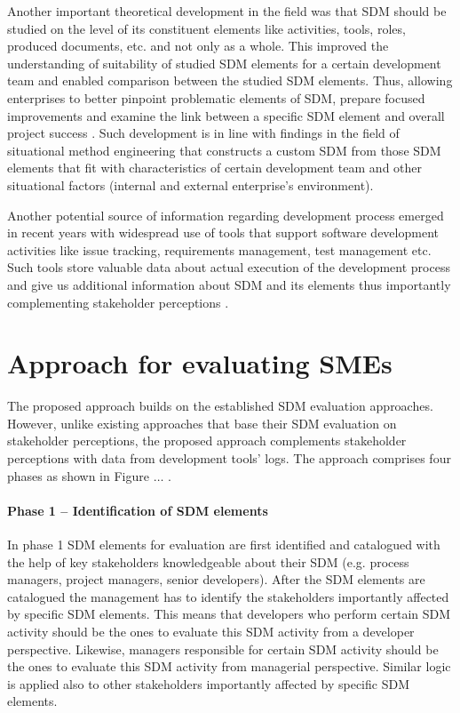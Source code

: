 Another important theoretical development in the field was that SDM should be studied on the level of its constituent elements like activities, tools, roles, produced documents, etc. and not only as a whole. This improved the understanding of suitability of studied SDM elements for a certain development team and enabled comparison between the studied SDM elements. Thus, allowing enterprises to better pinpoint problematic elements of SDM, prepare focused improvements and examine the link between a specific SDM element and overall project success \citep{atkinson1999project,hovelja2015exploring}. Such development is in line with findings in the field of situational method engineering \citep{DBLP:journals/ejis/KarlssonA09,DBLP:conf/caise/RalyteDR03} that constructs a custom SDM from those SDM elements that fit with characteristics of certain development team and other situational factors (internal and external enterprise’s environment). 

Another potential source of information regarding development process emerged in recent years with widespread use of tools that support software development activities like issue tracking, requirements management, test management etc. Such tools store valuable data about actual execution of the development process and give us additional information about SDM and its elements thus importantly complementing stakeholder perceptions \citep{DBLP:journals/ese/ChoetkiertikulD17,DBLP:conf/msr/MantylaADGO16,DBLP:conf/msr/OrtuMDTTMA16,DBLP:conf/icse/OrtuDKM15}. 

\section{Approach for evaluating SMEs}

The proposed approach builds on the established SDM evaluation approaches. However, unlike existing approaches that base their SDM evaluation on stakeholder perceptions, the proposed approach complements stakeholder perceptions with data from development tools’ logs. The approach comprises four phases as shown in Figure $\ldots$ .  




\paragraph{Phase 1 – Identification of SDM elements }

In phase 1 SDM elements for evaluation are first identified and catalogued with the help of key stakeholders knowledgeable about their SDM (e.g. process managers, project managers, senior developers). After the SDM elements are catalogued the management has to identify the stakeholders importantly affected by specific SDM elements. This means that developers who perform certain SDM activity should be the ones to evaluate this SDM activity from a developer perspective. Likewise, managers responsible for certain SDM activity should be the ones to evaluate this SDM activity from managerial perspective. Similar logic is applied also to other stakeholders importantly affected by specific SDM elements. 


